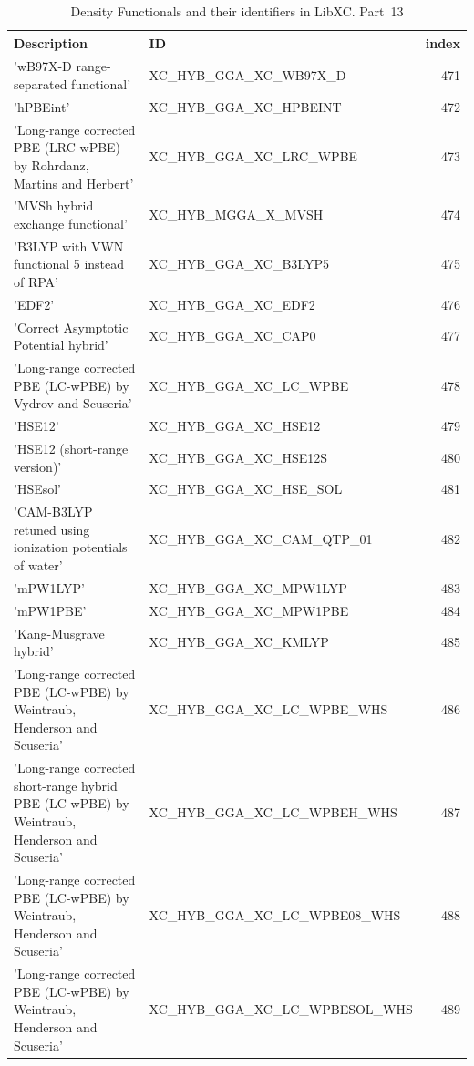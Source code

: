 \documentclass[final,12pt,makeidx,DIV=calc]{article}
\begin{document}
{{{\begin{table}[!h]
\caption{Density Functionals and their identifiers in LibXC. Part~13}
\begin{center}
\begin{tabular}{llr}
\hline
\hline
Description & ID & index\\
\hline
  'wB97X-D range-separated functional' & XC\_HYB\_GGA\_XC\_WB97X\_D  &471\\
  'hPBEint' & XC\_HYB\_GGA\_XC\_HPBEINT  &472\\
  'Long-range corrected PBE (LRC-wPBE) by Rohrdanz, Martins and Herbert' & XC\_HYB\_GGA\_XC\_LRC\_WPBE  &473\\
  'MVSh hybrid exchange functional' & XC\_HYB\_MGGA\_X\_MVSH  &474\\
  'B3LYP with VWN functional 5 instead of RPA' & XC\_HYB\_GGA\_XC\_B3LYP5  &475\\
  'EDF2' & XC\_HYB\_GGA\_XC\_EDF2  &476\\
  'Correct Asymptotic Potential hybrid' & XC\_HYB\_GGA\_XC\_CAP0  &477\\
  'Long-range corrected PBE (LC-wPBE) by Vydrov and Scuseria' & XC\_HYB\_GGA\_XC\_LC\_WPBE  &478\\
  'HSE12' & XC\_HYB\_GGA\_XC\_HSE12  &479\\
  'HSE12 (short-range version)' & XC\_HYB\_GGA\_XC\_HSE12S  &480\\
  'HSEsol' & XC\_HYB\_GGA\_XC\_HSE\_SOL  &481\\
  'CAM-B3LYP retuned using ionization potentials of water' & XC\_HYB\_GGA\_XC\_CAM\_QTP\_01  &482\\
  'mPW1LYP' & XC\_HYB\_GGA\_XC\_MPW1LYP  &483\\
  'mPW1PBE' & XC\_HYB\_GGA\_XC\_MPW1PBE  &484\\
  'Kang-Musgrave hybrid' & XC\_HYB\_GGA\_XC\_KMLYP  &485\\
  'Long-range corrected PBE (LC-wPBE) by Weintraub, Henderson and Scuseria' & XC\_HYB\_GGA\_XC\_LC\_WPBE\_WHS  &486\\
  'Long-range corrected short-range hybrid PBE (LC-wPBE) by Weintraub, Henderson and Scuseria' & XC\_HYB\_GGA\_XC\_LC\_WPBEH\_WHS  &487\\
  'Long-range corrected PBE (LC-wPBE) by Weintraub, Henderson and Scuseria' & XC\_HYB\_GGA\_XC\_LC\_WPBE08\_WHS  &488\\
  'Long-range corrected PBE (LC-wPBE) by Weintraub, Henderson and Scuseria' & XC\_HYB\_GGA\_XC\_LC\_WPBESOL\_WHS  &489\\

\end{tabular}
\end{center}
\end{table}}}}
\end{document}
